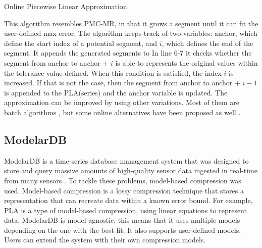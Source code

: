 \begin{algorithm}
\caption{Online Piecewise Linear Approximation \cite{lazaridis2003capturing}}\label{PLA}
\begin{algorithmic}[1]
    \EndWhile
\EndWhile
{}
\EndProcedure
\end{algorithmic}
\end{algorithm}

This algorithm resembles PMC-MR, in that it grows a segment until it can fit the user-defined
max error. The algorithm keeps track of two variables: anchor, which define the start index
of a potential segment, and $i$, which defines the end of the segment. It appends the generated
segments to  In line 6-7 it checks
whether the segment from anchor to anchor + $i$ is able to represents the original values
within the tolerance value defined.
When this condition is satisfied, the index $i$ is increased. If that is not the case,
then the segment from anchor to anchor + $i - 1$ is appended to the PLA(series)
and the anchor variable is updated. The approximation can be improved by using other variations.
Most of them are batch algorithms \cite{douglas1973algorithms}\cite{park1999fast}
\cite{keogh1998enhanced}, but some online alternatives have been
proposed as well \cite{keogh2001online}.

\subsection{ModelarDB}
ModelarDB is a time-series database management system that was designed to store and query
massive amounts of high-quality sensor data ingested in real-time from many sensors
\cite{jensen2018modelardb}.
To tackle these problems, model-based compression was used. Model-based compression is a
lossy compression technique that stores a representation that can recreate data within a
known error bound. For example, PLA is a type of model-based compression, using linear
equations to represent data. ModelarDB is model agnostic, this means that it uses multiple
models depending on the one with the best fit. It also supports user-defined models.
Users can extend the system with their own compression models.

